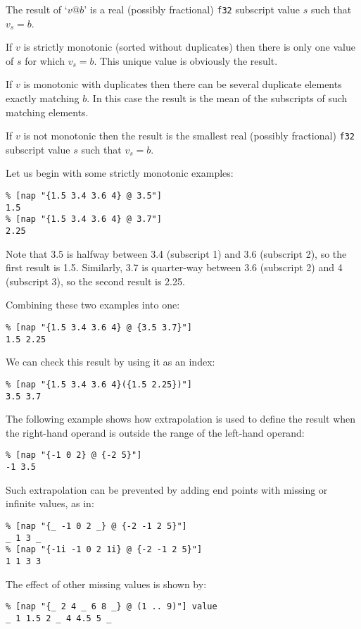 The result of `$v \texttt{@} b$' is a real
(possibly fractional) \texttt{f32} subscript value $s$ such that 
$v_s = b$.

If $v$ is strictly monotonic (sorted without duplicates) then there is
only one value of $s$ for which $v_s = b$.
This unique value is obviously the result.

If $v$ is monotonic with duplicates then there can be several duplicate
elements exactly matching $b$.
In this case the result is the mean of the subscripts of such matching elements.

If $v$ is not monotonic then the result is the smallest real
(possibly fractional) \texttt{f32} subscript value $s$ such that 
$v_s = b$.

Let us begin with some strictly monotonic examples:
  \begin{verbatim}
% [nap "{1.5 3.4 3.6 4} @ 3.5"]
1.5
% [nap "{1.5 3.4 3.6 4} @ 3.7"]
2.25
\end{verbatim}
  
 Note that 3.5 is halfway between 3.4 (subscript 1) and 3.6
  (subscript 2), so the first result is 1.5. Similarly, 3.7 is
  quarter-way between 3.6 (subscript 2) and 4 (subscript 3), so the
  second result is 2.25.
  
 Combining these two examples into one:
  \begin{verbatim}
% [nap "{1.5 3.4 3.6 4} @ {3.5 3.7}"]
1.5 2.25
\end{verbatim}
  
 We can check this result by using it as an index:
  \begin{verbatim}
% [nap "{1.5 3.4 3.6 4}({1.5 2.25})"]
3.5 3.7
\end{verbatim}

 The following example shows how extrapolation is used to define
  the result when the right-hand operand is outside the range of the
  left-hand operand:
  \begin{verbatim}
% [nap "{-1 0 2} @ {-2 5}"]
-1 3.5
\end{verbatim}
  
 Such extrapolation can be prevented by adding end points with
  missing or infinite values, as in:
  \begin{verbatim}
% [nap "{_ -1 0 2 _} @ {-2 -1 2 5}"]
_ 1 3 _
% [nap "{-1i -1 0 2 1i} @ {-2 -1 2 5}"]
1 1 3 3
\end{verbatim}

 The effect of other missing values is shown by:
  \begin{verbatim}
% [nap "{_ 2 4 _ 6 8 _} @ (1 .. 9)"] value
_ 1 1.5 2 _ 4 4.5 5 _
\end{verbatim}


